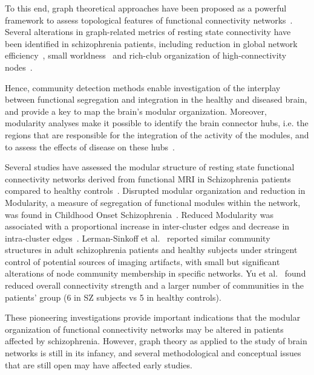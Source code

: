 To this end, graph theoretical approaches have been proposed as a powerful framework to assess topological features of functional connectivity networks~\cite{bassett2006,bullmore2009,kaiser2011,stam2007}.
Several alterations in graph-related metrics of resting state connectivity have been identified in schizophrenia patients, including reduction in global network efficiency~\cite{liu2008,bullmore2009,bassett2008}, small worldness~\cite{liu2008,anderson2013,yu2011} and rich-club organization of high-connectivity nodes~\cite{vandenheuvel2013}.

Hence, community detection methods enable investigation of the interplay between functional segregation and integration in the healthy and diseased brain, and provide a key to map the brain's modular organization.
Moreover, modularity analyses make it possible to identify the brain connector hubs, i.e. the regions that are responsible for the integration of the activity of the modules, and to assess the effects of disease on these hubs~\cite{vandenheuvel2013a}.

Several studies have assessed the modular structure of resting state functional connectivity networks derived from functional MRI in Schizophrenia patients compared to healthy controls~\cite{liu2008,alexander-bloch2010,lerman-sinkoff2016}.
Disrupted modular organization and reduction in Modularity, a measure of segregation of functional modules within the network, was found in Childhood Onset Schizophrenia~\cite{alexander-bloch2010}.
Reduced Modularity was associated with a proportional increase in inter-cluster edges and decrease in intra-cluster edges~\cite{alexander-bloch2012}.
Lerman-Sinkoff et al.~\cite{lerman-sinkoff2016} reported similar community structures in adult schizophrenia patients and healthy subjects under stringent control of potential sources of imaging artifacts, with small but significant alterations of node community membership in specific networks.
Yu et al.~\cite{yu2012} found reduced overall connectivity strength and a larger number of communities in the patients' group (6 in SZ subjects vs 5 in healthy controls).

These pioneering investigations provide important indications that the modular organization of functional connectivity networks may be altered in patients affected by schizophrenia.
However, graph theory as applied to the study of brain networks is still in its infancy, and several methodological and conceptual issues that are still open may have affected early studies.

